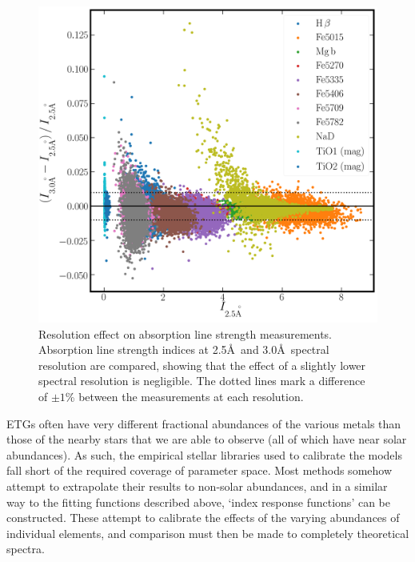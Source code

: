 			\begin{figure}
				\centering
				\includegraphics[width=.7\textwidth]{chapter2/compare_resolutions.png}
				\caption[Resolution effects on absorption line index strengths]{Resolution effect on absorption line strength measurements. Absorption line strength indices at 2.5\AA\ and 3.0\AA\ spectral resolution are compared, showing that the effect of a slightly lower spectral resolution is negligible. The dotted lines mark a difference of $\pm1$\% between the measurements at each resolution.}
				\label{fig:res}
			\end{figure}

			ETGs often have very different fractional abundances of the various metals than those of the nearby stars that we are able to observe (all of which have near solar abundances). As such, the empirical stellar libraries used to calibrate the models fall short of the required coverage of parameter space. Most methods somehow attempt to extrapolate their results to non-solar abundances, and in a similar way to the fitting functions described above, `index response functions' can be constructed. These attempt to calibrate the effects of the varying abundances of individual elements, and comparison must then be made to completely theoretical spectra.


